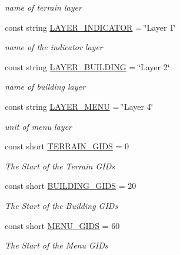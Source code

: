 \begin{DoxyCompactItemize}
\begin{DoxyCompactList}\small\item\em name of terrain layer \end{DoxyCompactList}\item 
const string \hyperlink{classClient_1_1Common_1_1Constants_1_1ClientConstants_a5eb5be4e8272c211a2c23c1a7bf50ac4}{L\+A\+Y\+E\+R\+\_\+\+I\+N\+D\+I\+C\+A\+T\+O\+R} = \char`\"{}Layer 1\char`\"{}
\begin{DoxyCompactList}\small\item\em name of the indicator layer \end{DoxyCompactList}\item 
const string \hyperlink{classClient_1_1Common_1_1Constants_1_1ClientConstants_a554dac3f46ee3f79accab315232412ec}{L\+A\+Y\+E\+R\+\_\+\+B\+U\+I\+L\+D\+I\+N\+G} = \char`\"{}Layer 2\char`\"{}
\begin{DoxyCompactList}\small\item\em name of building layer \end{DoxyCompactList}\item 
const string \hyperlink{classClient_1_1Common_1_1Constants_1_1ClientConstants_a02a25d01ffc1924cfc18976eca525190}{L\+A\+Y\+E\+R\+\_\+\+M\+E\+N\+U} = \char`\"{}Layer 4\char`\"{}
\begin{DoxyCompactList}\small\item\em unit of menu layer \end{DoxyCompactList}\item 
const short \hyperlink{classClient_1_1Common_1_1Constants_1_1ClientConstants_abb57eddf6044d2e0c032c08701733e23}{T\+E\+R\+R\+A\+I\+N\+\_\+\+G\+I\+D\+S} = 0
\begin{DoxyCompactList}\small\item\em The Start of the Terrain G\+I\+Ds \end{DoxyCompactList}\item 
const short \hyperlink{classClient_1_1Common_1_1Constants_1_1ClientConstants_ad2e944ac733f952d3d0c2e24fe5d14ad}{B\+U\+I\+L\+D\+I\+N\+G\+\_\+\+G\+I\+D\+S} = 20
\begin{DoxyCompactList}\small\item\em The Start of the Building G\+I\+Ds \end{DoxyCompactList}\item 
const short \hyperlink{classClient_1_1Common_1_1Constants_1_1ClientConstants_a4d3b0e4f36481c991c9995cb20c9347d}{M\+E\+N\+U\+\_\+\+G\+I\+D\+S} = 60
\begin{DoxyCompactList}\small\item\em The Start of the Menu G\+I\+Ds \end{DoxyCompactList}\item 

\end{DoxyCompactItemize}
